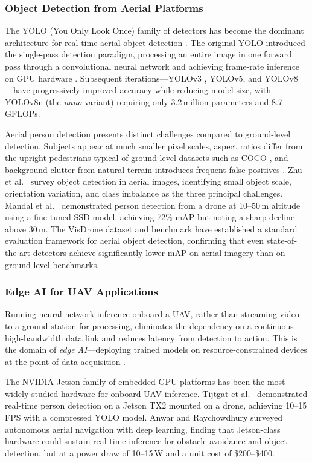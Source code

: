 \subsubsection{Object Detection from Aerial Platforms}

The YOLO (You Only Look Once) family of detectors has become the dominant architecture for real-time aerial object detection \cite{yolohistory}. The original YOLO introduced the single-pass detection paradigm, processing an entire image in one forward pass through a convolutional neural network and achieving frame-rate inference on GPU hardware \cite{yolohistory}. Subsequent iterations---YOLOv3 \cite{yolov3}, YOLOv5, and YOLOv8 \cite{yolov8}---have progressively improved accuracy while reducing model size, with YOLOv8n (the \textit{nano} variant) requiring only 3.2\,million parameters and 8.7\,GFLOPs.

Aerial person detection presents distinct challenges compared to ground-level detection. Subjects appear at much smaller pixel scales, aspect ratios differ from the upright pedestrians typical of ground-level datasets such as COCO \cite{lin2014coco}, and background clutter from natural terrain introduces frequent false positives \cite{zhu2021}. Zhu et al.\ \cite{zhu2021} survey object detection in aerial images, identifying small object scale, orientation variation, and class imbalance as the three principal challenges. Mandal et al.\ \cite{mandal2020} demonstrated person detection from a drone at 10--50\,m altitude using a fine-tuned SSD model, achieving 72\% mAP but noting a sharp decline above 30\,m. The VisDrone dataset and benchmark \cite{visdrone2021} have established a standard evaluation framework for aerial object detection, confirming that even state-of-the-art detectors achieve significantly lower mAP on aerial imagery than on ground-level benchmarks.

\subsubsection{Edge AI for UAV Applications}

Running neural network inference onboard a UAV, rather than streaming video to a ground station for processing, eliminates the dependency on a continuous high-bandwidth data link and reduces latency from detection to action. This is the domain of \textit{edge AI}---deploying trained models on resource-constrained devices at the point of data acquisition \cite{edgeai}.

The NVIDIA Jetson family of embedded GPU platforms has been the most widely studied hardware for onboard UAV inference. Tijtgat et al.\ \cite{tijtgat2017} demonstrated real-time person detection on a Jetson TX2 mounted on a drone, achieving 10--15\,FPS with a compressed YOLO model. Anwar and Raychowdhury \cite{anwar2020} surveyed autonomous aerial navigation with deep learning, finding that Jetson-class hardware could sustain real-time inference for obstacle avoidance and object detection, but at a power draw of 10--15\,W and a unit cost of \$200--\$400.

